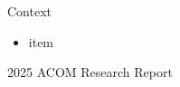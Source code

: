 \vspace{-0.27in}

\begin{block}{Context}
\begin{itemize}
\item item
\end{itemize}
\end{block}

\begin{exampleblock}{2025 ACOM Research Report}
\end{exampleblock}
